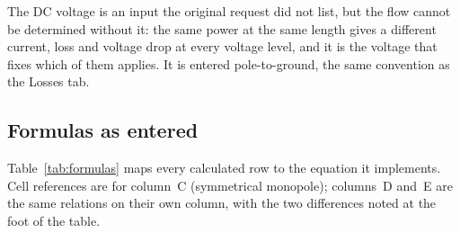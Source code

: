 The DC voltage is an input the original request did not list, but the flow
cannot be determined without it: the same power at the same length gives a
different current, loss and voltage drop at every voltage level, and it is the
voltage that fixes which of them applies. It is entered pole-to-ground, the
same convention as the Losses tab.

\subsection{Formulas as entered}
Table~\ref{tab:formulas} maps every calculated row to the equation it
implements. Cell references are for column~C (symmetrical monopole); columns~D
and~E are the same relations on their own column, with the two differences
noted at the foot of the table.

